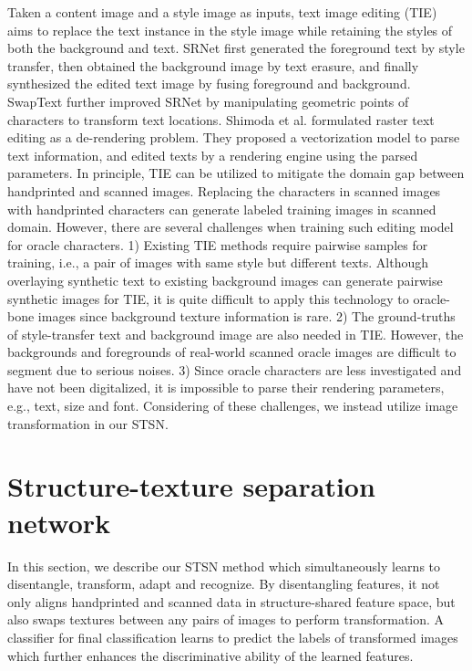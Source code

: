 \documentclass[10pt,journal,compsoc,twocolumn ]{IEEEtran}
\begin{document}
Taken a content image and a style image as inputs, text image editing (TIE) \cite{wu2019editing,yang2020swaptext,shimoda2021rendering} aims to replace the text instance in the style image while retaining the styles of both the background and text. SRNet \cite{wu2019editing} first generated the foreground text by style transfer, then obtained the background image by text erasure, and finally synthesized the edited text image by fusing foreground and background. SwapText \cite{yang2020swaptext} further improved SRNet by manipulating geometric points of characters to transform text locations. Shimoda et al. \cite{shimoda2021rendering} formulated raster text editing as a de-rendering problem. They proposed a vectorization model to parse text information, and edited texts by a rendering engine using the parsed parameters. In principle, TIE can be utilized to mitigate the domain gap between handprinted and scanned images. Replacing the characters in scanned images with handprinted characters can generate labeled training images in scanned domain. However, there are several challenges when training such editing model for oracle characters. 1) Existing TIE methods require pairwise samples for training, i.e., a pair of images with same style but different texts. Although overlaying synthetic text to existing background images can generate pairwise synthetic images for TIE, it is quite difficult to apply this technology to oracle-bone images since background texture information is rare. 2) The ground-truths of style-transfer text and background image are also needed in TIE. However, the backgrounds and foregrounds of real-world scanned oracle images are difficult to segment due to serious noises. 3) Since oracle characters are less investigated and have not been digitalized, it is impossible to parse their rendering parameters, e.g., text, size and font. Considering of these challenges, we instead utilize image transformation in our STSN.

\section{Structure-texture separation network}

In this section, we describe our STSN method which simultaneously learns to disentangle, transform, adapt and recognize. By disentangling features, it not only aligns handprinted and scanned data in structure-shared feature space, but also swaps textures between any pairs of images to perform transformation. A classifier for final classification learns to predict the labels of transformed images which further enhances the discriminative ability of the learned features.
\end{document}
